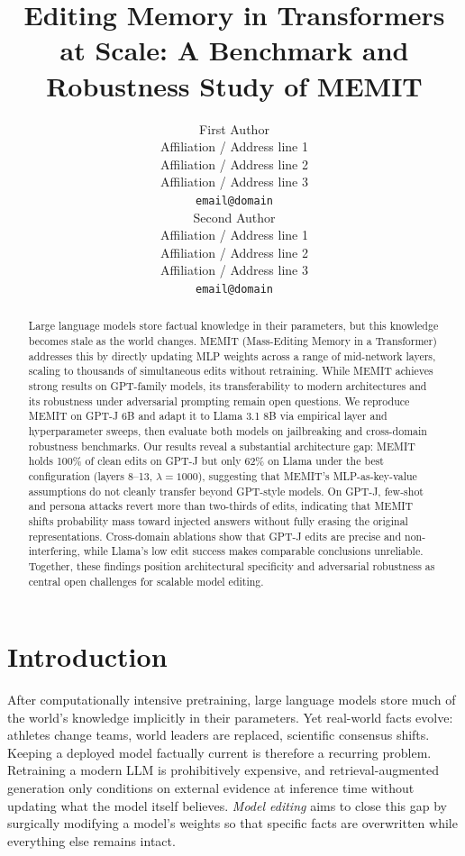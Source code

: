 \documentclass[11pt]{article}
\title{Editing Memory in Transformers at Scale: A Benchmark and Robustness Study of MEMIT}
\author{First Author \\
  Affiliation / Address line 1 \\
  Affiliation / Address line 2 \\
  Affiliation / Address line 3 \\
  \texttt{email@domain} \\\And
  Second Author \\
  Affiliation / Address line 1 \\
  Affiliation / Address line 2 \\
  Affiliation / Address line 3 \\
  \texttt{email@domain} \\}
\begin{document}
\maketitle

\begin{abstract}
Large language models store factual knowledge in their parameters, but this knowledge becomes stale as the world changes. MEMIT (Mass-Editing Memory in a Transformer) addresses this by directly updating MLP weights across a range of mid-network layers, scaling to thousands of simultaneous edits without retraining. While MEMIT achieves strong results on GPT-family models, its transferability to modern architectures and its robustness under adversarial prompting remain open questions. We reproduce MEMIT on GPT-J 6B and adapt it to Llama 3.1 8B via empirical layer and hyperparameter sweeps, then evaluate both models on jailbreaking and cross-domain robustness benchmarks. Our results reveal a substantial architecture gap: MEMIT holds 100\% of clean edits on GPT-J but only 62\% on Llama under the best configuration (layers 8--13, $\lambda{=}1000$), suggesting that MEMIT's MLP-as-key-value assumptions do not cleanly transfer beyond GPT-style models. On GPT-J, few-shot and persona attacks revert more than two-thirds of edits, indicating that MEMIT shifts probability mass toward injected answers without fully erasing the original representations. Cross-domain ablations show that GPT-J edits are precise and non-interfering, while Llama's low edit success makes comparable conclusions unreliable. Together, these findings position architectural specificity and adversarial robustness as central open challenges for scalable model editing.
\end{abstract}

\section{Introduction}
After computationally intensive pretraining, large language models store much of the world's knowledge implicitly in their parameters. Yet real-world facts evolve: athletes change teams, world leaders are replaced, scientific consensus shifts. Keeping a deployed model factually current is therefore a recurring problem. Retraining a modern LLM is prohibitively expensive, and retrieval-augmented generation only conditions on external evidence at inference time without updating what the model itself believes. \emph{Model editing} aims to close this gap by surgically modifying a model's weights so that specific facts are overwritten while everything else remains intact.
\end{document}
